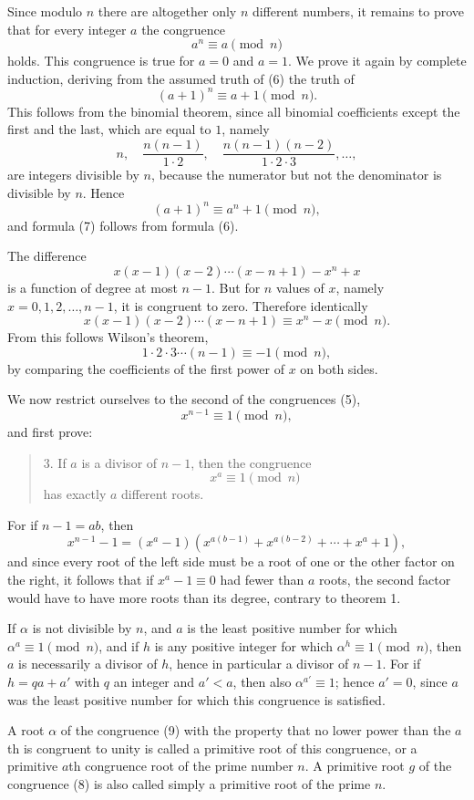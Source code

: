 \documentclass[11pt]{article}
\begin{document}
Since modulo $n$ there are altogether only $n$ different numbers, it remains to prove that for every integer $a$ the congruence
\[
\tag{6}        a^n\equiv a\pmod n
\]
holds. This congruence is true for $a=0$ and $a=1$. We prove it again by complete induction, deriving from the assumed truth of (6) the truth of
\[
\tag{7}        (a+1)^n\equiv a+1\pmod n.
\]
This follows from the binomial theorem, since all binomial coefficients except the first and the last, which are equal to $1$, namely
\[
        n,\quad \frac{n(n-1)}{1\cdot2},\quad \frac{n(n-1)(n-2)}{1\cdot2\cdot3},\ldots,
\]
are integers divisible by $n$, because the numerator but not the denominator is divisible by $n$. Hence
\[
        (a+1)^n\equiv a^n+1\pmod n,
\]
and formula (7) follows from formula (6).

The difference
\[
        x(x-1)(x-2)\cdots(x-n+1)-x^n+x
\]
is a function of degree at most $n-1$. But for $n$ values of $x$, namely $x=0,1,2,\ldots,n-1$, it is congruent to zero. Therefore identically
\[
        x(x-1)(x-2)\cdots(x-n+1)\equiv x^n-x\pmod n.
\]
From this follows Wilson's theorem,
\[
        1\cdot2\cdot3\cdots(n-1)\equiv-1\pmod n,
\]
by comparing the coefficients of the first power of $x$ on both sides.

We now restrict ourselves to the second of the congruences (5),
\[
\tag{8}        x^{n-1}\equiv1\pmod n,
\]
and first prove:
\begin{quote}
3. If $a$ is a divisor of $n-1$, then the congruence
\[
\tag{9}        x^a\equiv1\pmod n
\]
has exactly $a$ different roots.
\end{quote}
For if $n-1=ab$, then
\[
        x^{n-1}-1=(x^a-1)(x^{a(b-1)}+x^{a(b-2)}+\cdots+x^a+1),
\]
and since every root of the left side must be a root of one or the other factor on the right, it follows that if $x^a-1\equiv0$ had fewer than $a$ roots, the second factor would have to have more roots than its degree, contrary to theorem 1.

If $\alpha$ is not divisible by $n$, and $a$ is the least positive number for which $\alpha^a\equiv1\pmod n$, and if $h$ is any positive integer for which $\alpha^h\equiv1\pmod n$, then $a$ is necessarily a divisor of $h$, hence in particular a divisor of $n-1$. For if $h=qa+a'$ with $q$ an integer and $a'<a$, then also $\alpha^{a'}\equiv1$; hence $a'=0$, since $a$ was the least positive number for which this congruence is satisfied.

A root $\alpha$ of the congruence (9) with the property that no lower power than the $a$th is congruent to unity is called a primitive root of this congruence, or a primitive $a$th congruence root of the prime number $n$. A primitive root $g$ of the congruence (8) is also called simply a primitive root of the prime $n$.
\end{document}
